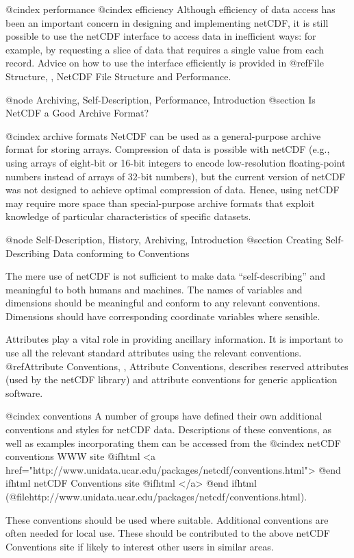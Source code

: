 @cindex performance
@cindex efficiency
Although efficiency of data access has been an important concern in
designing and implementing netCDF,
it is still possible to use the netCDF interface to
access data in inefficient ways: for example, by requesting a slice of
data that requires a single value from each record.
Advice on how to use the interface efficiently is provided in
@ref{File Structure, , NetCDF File Structure and Performance}.

@node Archiving, Self-Description, Performance, Introduction
@section Is NetCDF a Good Archive Format?

@cindex archive formats
NetCDF can be used as a general-purpose archive format for storing
arrays.  Compression of data is
possible with netCDF (e.g., using arrays of eight-bit or 16-bit integers
to encode low-resolution floating-point numbers instead of arrays of
32-bit numbers), but the current version of netCDF was not designed to
achieve optimal compression of data.  Hence, using netCDF may
require more space than special-purpose archive formats that exploit
knowledge of particular characteristics of specific datasets.

@node Self-Description, History, Archiving, Introduction
@section Creating Self-Describing Data conforming to Conventions

The mere use of netCDF is not sufficient to make data
``self-describing'' and meaningful to both humans and machines.
The names of variables and dimensions should be meaningful and conform to
any relevant conventions.
Dimensions should have corresponding coordinate variables where sensible.

Attributes  play a vital role in providing ancillary information.
It is important to use all the relevant standard attributes using
the relevant conventions.
@ref{Attribute Conventions, , Attribute Conventions},
describes reserved attributes (used by the netCDF library) and attribute
conventions for generic application software.

@cindex conventions
A number of groups have defined their own additional conventions and
styles for netCDF data.  Descriptions of these conventions, as well as
examples incorporating them can be accessed from the
@cindex netCDF conventions WWW site
@ifhtml
<a href="http://www.unidata.ucar.edu/packages/netcdf/conventions.html">
@end ifhtml
netCDF Conventions site
@ifhtml
</a>
@end ifhtml
(@file{http://www.unidata.ucar.edu/packages/netcdf/conventions.html}).

These conventions should be used where suitable.
Additional conventions are often needed for local use.
These should be contributed to the above
netCDF Conventions site if likely to interest other users in similar areas.

